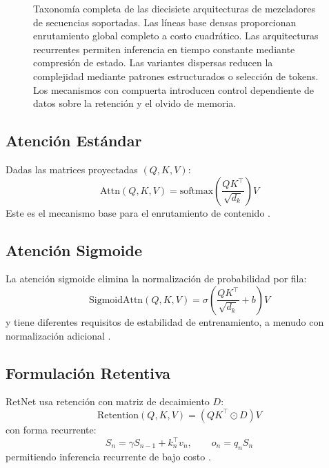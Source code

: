 \documentclass[11pt,a4paper]{article}
\begin{document}
\begin{figure}[t]
{}
\caption{Taxonomía completa de las diecisiete arquitecturas de mezcladores de secuencias soportadas. Las líneas base densas proporcionan enrutamiento global completo a costo cuadrático. Las arquitecturas recurrentes permiten inferencia en tiempo constante mediante compresión de estado. Las variantes dispersas reducen la complejidad mediante patrones estructurados o selección de tokens. Los mecanismos con compuerta introducen control dependiente de datos sobre la retención y el olvido de memoria.}
\label{fig:comprehensive-taxonomy}
\end{figure}

\subsection{Atención Estándar}
Dadas las matrices proyectadas $(Q,K,V)$:
\[
\text{Attn}(Q,K,V)=\text{softmax}\left(\frac{QK^\top}{\sqrt{d_k}}\right)V
\]
Este es el mecanismo base para el enrutamiento de contenido \citep{vaswani_attention_2017}.

\subsection{Atención Sigmoide}
La atención sigmoide elimina la normalización de probabilidad por fila:
\[
\text{SigmoidAttn}(Q,K,V)=\sigma\left(\frac{QK^\top}{\sqrt{d_k}}+b\right)V
\]
y tiene diferentes requisitos de estabilidad de entrenamiento, a menudo con normalización adicional \citep{ramapuram_theory_2024}.

\subsection{Formulación Retentiva}
RetNet usa retención con matriz de decaimiento $D$:
\[
\text{Retention}(Q,K,V)=\left(QK^\top \odot D\right)V
\]
con forma recurrente:
\[
S_n=\gamma S_{n-1}+k_n^\top v_n,\qquad o_n=q_n S_n
\]
permitiendo inferencia recurrente de bajo costo \citep{sun_retentive_2023,yang_survey_2025}.
\end{document}
